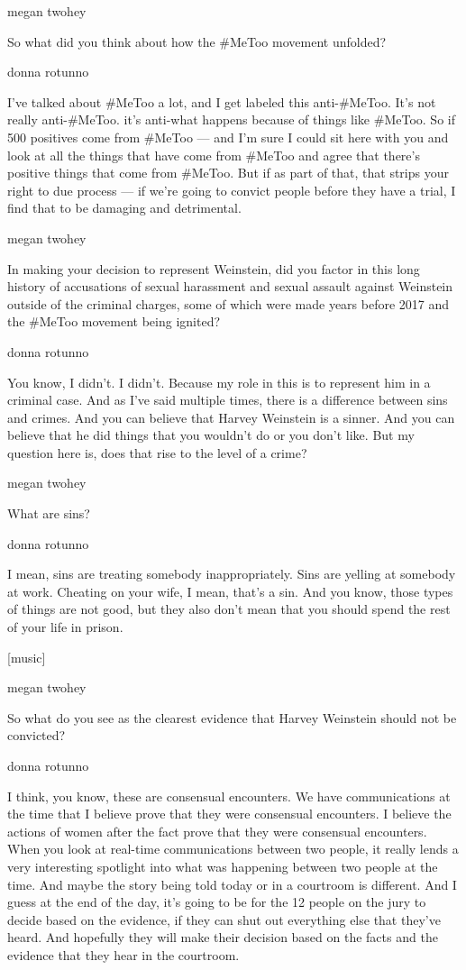 megan twohey

So what did you think about how the \#MeToo movement unfolded?

donna rotunno

I've talked about \#MeToo a lot, and I get labeled this anti-\#MeToo.
It's not really anti-\#MeToo. it's anti-what happens because of things
like \#MeToo. So if 500 positives come from \#MeToo --- and I'm sure I
could sit here with you and look at all the things that have come from
\#MeToo and agree that there's positive things that come from \#MeToo.
But if as part of that, that strips your right to due process --- if
we're going to convict people before they have a trial, I find that to
be damaging and detrimental.

megan twohey

In making your decision to represent Weinstein, did you factor in this
long history of accusations of sexual harassment and sexual assault
against Weinstein outside of the criminal charges, some of which were
made years before 2017 and the \#MeToo movement being ignited?

donna rotunno

You know, I didn't. I didn't. Because my role in this is to represent
him in a criminal case. And as I've said multiple times, there is a
difference between sins and crimes. And you can believe that Harvey
Weinstein is a sinner. And you can believe that he did things that you
wouldn't do or you don't like. But my question here is, does that rise
to the level of a crime?

megan twohey

What are sins?

donna rotunno

I mean, sins are treating somebody inappropriately. Sins are yelling at
somebody at work. Cheating on your wife, I mean, that's a sin. And you
know, those types of things are not good, but they also don't mean that
you should spend the rest of your life in prison.

{[}music{]}

megan twohey

So what do you see as the clearest evidence that Harvey Weinstein should
not be convicted?

donna rotunno

I think, you know, these are consensual encounters. We have
communications at the time that I believe prove that they were
consensual encounters. I believe the actions of women after the fact
prove that they were consensual encounters. When you look at real-time
communications between two people, it really lends a very interesting
spotlight into what was happening between two people at the time. And
maybe the story being told today or in a courtroom is different. And I
guess at the end of the day, it's going to be for the 12 people on the
jury to decide based on the evidence, if they can shut out everything
else that they've heard. And hopefully they will make their decision
based on the facts and the evidence that they hear in the courtroom.

